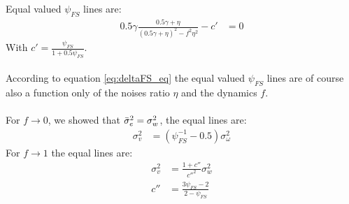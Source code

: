 \documentclass[oneside,12pt]{article}
\begin{document}
%
Equal valued $\psi_{FS}$ lines are:
%
\begin{equation}\label{eq:deltaFS_eq}
    \begin{split}
        0.5\gamma \frac{0.5\gamma + \eta}{(0.5\gamma + \eta)^2 - f^2 \eta^2} -c' &= 0
    \end{split}
\end{equation}
%
With $c' = \frac{\psi_{FS}}{1+0.5\psi_{FS}}$.\\\\
%
%
According to equation \ref{eq:deltaFS_eq} the equal valued $\psi_{FS}$ lines are of course also a function only of the noises ratio $\eta$ and the dynamics $f$.\\\\ %
For $f \xrightarrow{} 0$, we showed that $\Bar{\sigma}_e^2 = \sigma_w^2$, the equal lines are:
%
\begin{equation}
    \begin{split}
        \sigma_v^2 &= \left( \psi_{FS}^{-1}-0.5 \right)\sigma_\omega^2
    \end{split}
\end{equation}
%
For $f \xrightarrow{} 1$ the equal lines are:
\begin{equation}\label{eq:lin_f_1}
    \begin{split}
        \sigma_v^2 &= \frac{1+c''}{{c''}^2}\sigma_w^2\\
        c'' &= \frac{3\psi_{FS}-2}{2-\psi_{FS}}
    \end{split}
\end{equation}
%
\end{document}
